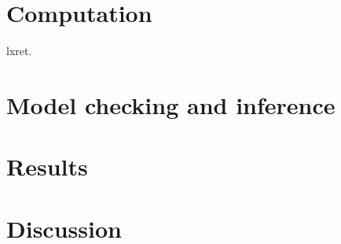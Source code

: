 \documentclass[11pt]{article}
\begin{document}
\section{Computation}
lxret.
\section{Model checking and inference}


\section{Results}
\section{Discussion}



\clearpage

\end{document}
